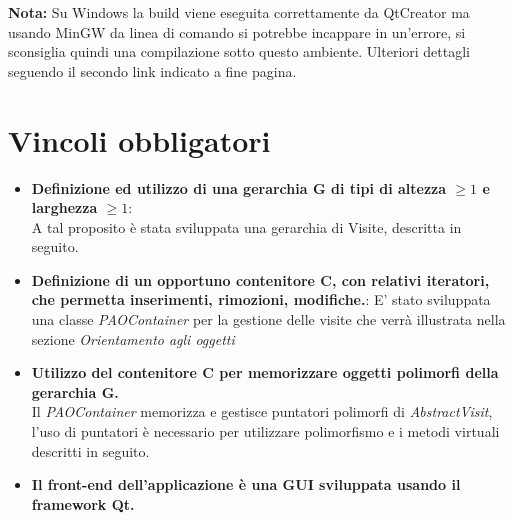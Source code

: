 \textbf{Nota:} Su Windows la build viene eseguita correttamente da QtCreator ma usando MinGW da linea di comando si potrebbe incappare in un'errore, si sconsiglia quindi una compilazione sotto questo ambiente. Ulteriori dettagli seguendo il secondo link indicato a fine pagina. 

\section{Vincoli obbligatori}
\begin{itemize}
\item \textbf{Definizione ed utilizzo di una gerarchia G di tipi di altezza $\geq 1$ e larghezza $\geq 1$}: \\ A tal proposito è stata sviluppata una gerarchia di Visite, descritta in seguito.
\item \textbf{ Definizione di un opportuno contenitore C, con relativi iteratori, che permetta inserimenti, rimozioni, modifiche.}: E' stato sviluppata una classe \textit{PAOContainer} per la gestione delle visite che verrà illustrata nella sezione \textit{Orientamento agli oggetti}
\item \textbf{Utilizzo del contenitore C per memorizzare oggetti polimorfi della gerarchia G.} \\Il \textit{PAOContainer} memorizza e gestisce puntatori polimorfi di \textit{AbstractVisit}, l'uso di puntatori è necessario per utilizzare polimorfismo e i metodi virtuali descritti in seguito.
\item \textbf{Il front-end dell’applicazione è una GUI sviluppata usando il framework Qt.}
\end{itemize}
\
